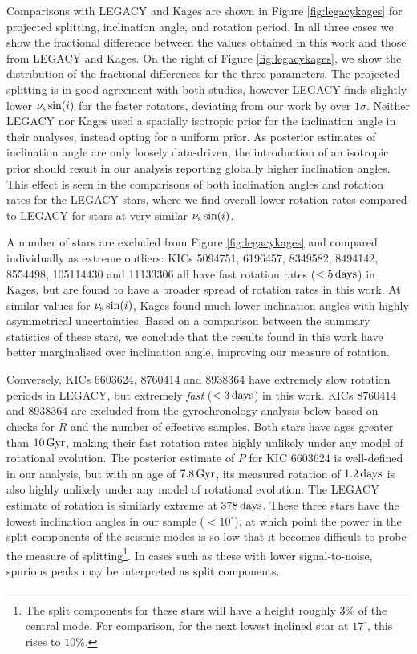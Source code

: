 Comparisons with LEGACY and Kages are shown in Figure \ref{fig:legacykages} for projected splitting, inclination angle, and rotation period. In all three cases we show the fractional difference between the values obtained in this work and those from LEGACY and Kages. On the right of Figure \ref{fig:legacykages}, we show the distribution of the fractional differences for the three parameters.
The projected splitting is in good agreement with both studies, however LEGACY finds slightly lower $\nu_{\rm s}\sin(i)$ for the faster rotators, deviating from our work by over $1\sigma$. Neither LEGACY nor Kages used a spatially isotropic prior for the inclination angle in their analyses, instead opting for a uniform prior. As posterior estimates of inclination angle are only loosely data-driven, the introduction of an isotropic prior should result in our analysis reporting globally higher inclination angles. This effect is seen in the comparisons of both inclination angles and rotation rates for the LEGACY stars, where we find overall lower rotation rates compared to LEGACY for stars at very similar $\nu_{\rm s}\sin(i)$.

A number of stars are excluded from Figure \ref{fig:legacykages} and compared individually as extreme outliers: KICs 5094751, 6196457, 8349582, 8494142, 8554498, 105114430 and 11133306 all have fast rotation rates ($<5\, \rm days$) in Kages, but are found to have a broader spread of rotation rates in this work. At similar values for $\nu_{\rm s}\sin(i)$, Kages found much lower inclination angles with highly asymmetrical uncertainties. Based on a comparison between the summary statistics of these stars, we conclude that the results found in this work have better marginalised over inclination angle, improving our measure of rotation.

Conversely, KICs 6603624, 8760414 and 8938364 have extremely slow rotation periods in LEGACY, but extremely \textit{fast} ($<3\, \rm {days}$) in this work. KICs 8760414 and 8938364 are excluded from the gyrochronology analysis below based on checks for $\hat{R}$ and the number of effective samples. Both stars have ages greater than $10\, \rm Gyr$, making their fast rotation rates highly unlikely under any model of rotational evolution. The posterior estimate of $P$ for KIC 6603624 is well-defined in our analysis, but with an age of $7.8\, \rm Gyr$, its measured rotation of $1.2\, \rm days$ is also highly unlikely under any model of rotational evolution. The LEGACY estimate of rotation is similarly extreme at $378\, \rm days$. These three stars have the lowest inclination angles in our sample ($< 10^\circ$), at which point the power in the split components of the seismic modes is so low that it becomes difficult to probe the measure of splitting\footnote{The split components for these stars will have a height roughly 3\% of the central mode. For comparison, for the next lowest inclined star at $17^\circ$, this rises to $10\%$.}. In cases such as these with lower signal-to-noise, spurious peaks may be interpreted as split components.\\

